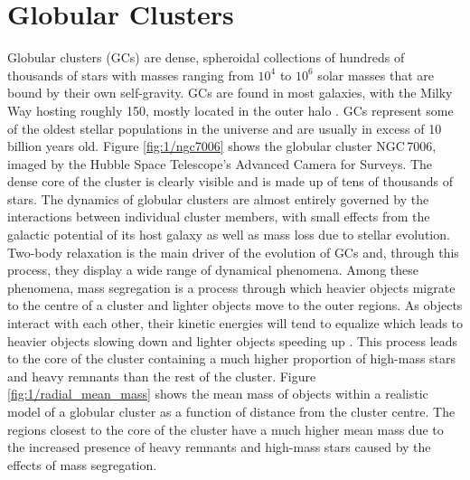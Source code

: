 

\section{Globular Clusters}


Globular clusters (GCs) are dense, spheroidal collections of hundreds of thousands of stars with
masses ranging from $10^4$ to $10^6$ solar masses that are bound by their own self-gravity. GCs are
found in most galaxies, with the Milky Way hosting roughly 150, mostly located in the outer halo
\citep[e.g.][]{Heggie2003}. GCs represent some of the oldest stellar populations in the universe and
are usually in excess of 10 billion years old. Figure \ref{fig:1/ngc7006} shows the globular cluster
NGC\,7006, imaged by the Hubble Space Telescope's Advanced Camera for Surveys. The dense core of the
cluster is clearly visible and is made up of tens of thousands of stars. The dynamics of globular
clusters are almost entirely governed by the interactions between individual cluster members, with
small effects from the galactic potential of its host galaxy as well as mass loss due to stellar
evolution. Two-body relaxation is the main driver of the evolution of GCs and, through this process,
they display a wide range of dynamical phenomena. Among these phenomena, mass segregation is a
process through which heavier objects migrate to the centre of a cluster and lighter objects move to
the outer regions. As objects interact with each other, their kinetic energies will tend to equalize
which leads to heavier objects slowing down and lighter objects speeding up
\citep[e.g.][]{Heggie2003}. This process leads to the core of the cluster containing a much higher
proportion of high-mass stars and heavy remnants than the rest of the cluster. Figure
\ref{fig:1/radial_mean_mass} shows the mean mass of objects within a realistic model of a globular
cluster as a function of distance from the cluster centre. The regions closest to the core of the
cluster have a much higher mean mass due to the increased presence of heavy remnants and high-mass
stars caused by the effects of mass segregation.

